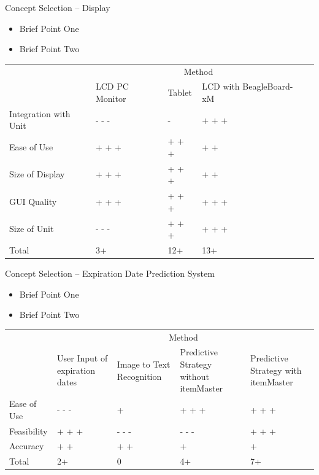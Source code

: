 \documentclass[t]{beamer}
\begin{document}
\begin{frame}{Concept Selection -- Display}
\begin{itemize}
\item Brief Point One
\item Brief Point Two
\end{itemize}
\vspace{.5cm}
\footnotesize
\begin{tabular}{| p{1.3in} | p{.7in} | p{0.7in} | p{1.0in} | p{.8in} |}
\cline{2-4}
\multicolumn{1}{c}{}&\multicolumn{3}{|c|}{Method} \\
\cline{2-4}
\multicolumn{1}{c|}{}&LCD PC \newline Monitor&Tablet&LCD with \newline BeagleBoard-xM\\
\hline
Integration with Unit&- - -&-&+ + +\\
\hline
Ease of Use&+ + +&+ + +&+ +\\
\hline
Size of Display& + + + &+ + +&+ +\\
\hline
GUI Quality&+ + +&+ + +&+ + +\\
\hline
Size of Unit&- - -&+ + +&+ + +\\
\hline
\hline
Total&3+&12+&13+\\
\hline
\end{tabular}
\end{frame}

\begin{frame}{Concept Selection -- Expiration Date Prediction System}
\begin{itemize}
\item Brief Point One
\item Brief Point Two
\end{itemize}
\vspace{.5cm}
\footnotesize
\begin{tabular}{| p{.7in} | p{.7in} | p{.8in} | p{.9in} | p{.8in} |}
\cline{2-5}
\multicolumn{1}{c}{}&\multicolumn{4}{|c|}{Method} \\
\cline{2-5}
\multicolumn{1}{c|}{}&User Input \newline of expiration \newline dates& Image to Text \newline Recognition & Predictive \newline Strategy without \newline itemMaster& Predictive \newline Strategy with \newline itemMaster \\
\hline
Ease of Use&- - -&+&+ + +&+ + +\\
\hline
Feasibility&+ + +&- - -&- - -&+ + +\\
\hline
Accuracy & + + & + + &+&+\\
\hline \hline
Total &2+ &0&4+&7+\\
\hline
\end{tabular}
\end{frame}
\end{document}
